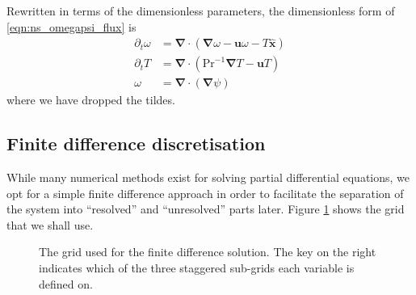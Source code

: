 \documentclass{article}
\renewcommand\vec{\bm}
\newcommand{\uvec}[1]{\vec{\hat{#1}}}
\newcommand{\grad}{\vec{\nabla}}
\newcommand{\prandtl}{\ensuremath{\mathrm{Pr}}}
\begin{document}
Rewritten in terms of the dimensionless parameters, the dimensionless form of
\autoref{eqn:ns_omegapsi_flux} is
\begin{subequations} \label{eqn:rbc}
\begin{align}
    \label{eqn:rbc_omega}
    \partial_t \omega &= \grad \cdot (\grad \omega - \vec{u} \omega
        - T \uvec{x}) \\
    \label{eqn:rbc_T}
    \partial_t T &= \grad \cdot (\prandtl^{-1} \grad T - \vec{u} T) \\
    \label{eqn:rbc_poisson}
    \omega &= \grad \cdot (\grad \psi)
\end{align}
\end{subequations}
where we have dropped the tildes.

\subsection{Finite difference discretisation}
While many numerical methods exist for solving partial differential equations,
we opt for a simple finite difference approach in order to facilitate the
separation of the system into ``resolved'' and ``unresolved'' parts later.
Figure \ref{fig:fdgrid} shows the grid that we shall use.
\begin{figure}[ht]
    \centering
    
    \caption{
        The grid used for the finite difference solution. The key on the
        right indicates which of the three staggered sub-grids each variable
        is defined on.
    }
    \label{fig:fdgrid}
\end{figure}
\end{document}
